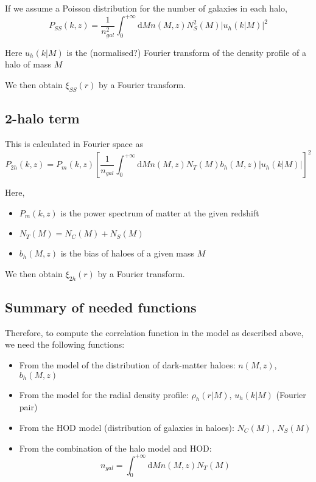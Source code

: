 \documentclass[10pt,a4paper]{article}
\begin{document}
If we assume a Poisson distribution for the number of galaxies in each halo,
\begin{equation}
P_{SS}(k,z) = \frac{1}{n_{gal}^2}\int_0^{+\infty} \mathrm{d}M n(M,z) N_S^2(M) \left| u_h(k|M)\right|^2
\end{equation}

Here $u_h(k|M)$ is the (normalised?) Fourier transform of the density profile of a halo of mass $M$

We then obtain $\xi_{SS}(r)$ by a Fourier transform.

\subsection{2-halo term}

This is calculated in Fourier space as
\begin{equation}
P_{2h}(k,z) = P_m(k,z)\left[ \frac{1}{n_{gal}} \int_0^{+\infty} \mathrm{d}M n(M,z) N_T(M) b_h(M,z) \left| u_h(k|M)\right| \right]^2
\end{equation}

Here,
\begin{itemize}
\item $P_m(k,z)$ is the power spectrum of matter at the given redshift
\item $N_T(M) = N_C(M) + N_S(M)$
\item $b_h(M,z)$ is the bias of haloes of a given mass $M$
\end{itemize}

We then obtain $\xi_{2h}(r)$ by a Fourier transform.

\subsection{Summary of needed functions}

Therefore, to compute the correlation function in the model as described above, we need the following functions:

\begin{itemize}
\item From the model of the distribution of dark-matter haloes: $n(M,z)$, $b_h(M,z)$
\item From the model for the radial density profile: $\rho_h(r|M)$, $u_h(k|M)$ (Fourier pair)
\item From the HOD model (distribution of galaxies in haloes): $N_C(M)$, $N_S(M)$
\item From the combination of the halo model and HOD:
\begin{equation}
n_{gal} = \int_0^{+\infty} \mathrm{d}M n(M,z) N_T(M)
\end{equation}
\end{itemize}
\end{document}

